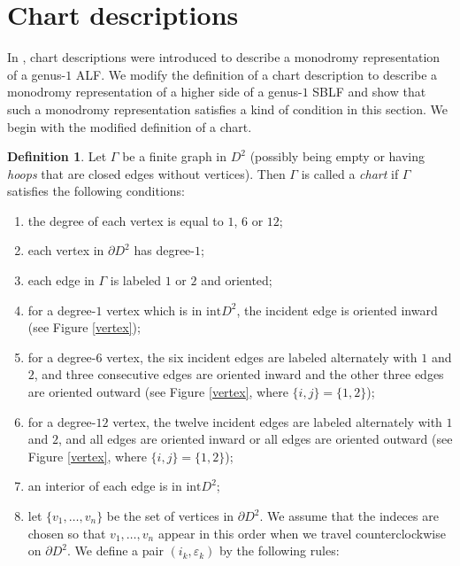 \documentclass{amsart}
\theoremstyle{plain}
\theoremstyle{definition}
\newtheorem{defn}[thm]{Definition}
\begin{document}
\section{Chart descriptions}
In \cite{KMMW}, chart descriptions were introduced to describe a monodromy representation of a genus-$1$ ALF. 
We modify the definition of a chart description to describe a monodromy representation of a higher side of a genus-$1$ SBLF 
and show that such a monodromy representation satisfies a kind of condition in this section. 
We begin with the modified definition of a chart. 

\begin{defn}
Let $\Gamma$ be a finite graph in $D^2$ (possibly being empty or having {\it hoops} that are closed edges without vertices). 
Then $\Gamma$ is called a {\it chart} if $\Gamma$ satisfies the following conditions: 

\begin{enumerate}[(1)]
\item the degree of each vertex is equal to $1$, $6$ or $12$; 

\item each vertex in $\partial D^2$ has degree-$1$; 

\item each edge in $\Gamma$ is labeled $1$ or $2$ and oriented; 

\item for a degree-$1$ vertex which is in $\text{int}D^2$, the incident edge is oriented inward (see Figure \ref{vertex}); 

\item for a degree-$6$ vertex, the six incident edges are labeled alternately with $1$ and $2$, 
and three consecutive edges are oriented inward and the other three edges are oriented outward (see Figure \ref{vertex}, where $\{i,j\}=\{1,2\}$); 

\item for a degree-$12$ vertex, the twelve incident edges are labeled alternately with $1$ and $2$, 
and all edges are oriented inward or all edges are oriented outward (see Figure \ref{vertex}, where $\{i,j\}=\{1,2\}$); 

\item an interior of each edge is in $\text{int}D^2$; 

\item let $\{v_1,\ldots,v_n\}$ be the set of vertices in $\partial D^2$. 
We assume that the indeces are chosen so that $v_1,\ldots,v_n$ appear in this order when we travel counterclockwise on $\partial D^2$. 
We define a pair $(i_k,\varepsilon_k)$ by the following rules: 


\end{enumerate}
\end{defn}
\end{document}

